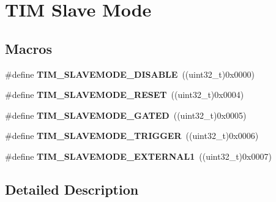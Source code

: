 \hypertarget{group___t_i_m___slave___mode}{}\section{T\+IM Slave Mode}
\label{group___t_i_m___slave___mode}
\subsection*{Macros}
\begin{DoxyCompactItemize}
\item 
\#define {\bfseries T\+I\+M\+\_\+\+S\+L\+A\+V\+E\+M\+O\+D\+E\+\_\+\+D\+I\+S\+A\+B\+LE}~((uint32\+\_\+t)0x0000)\hypertarget{group___t_i_m___slave___mode_ga3b53e1a85d08f125df4371f86bdaf79b}{}\label{group___t_i_m___slave___mode_ga3b53e1a85d08f125df4371f86bdaf79b}

\item 
\#define {\bfseries T\+I\+M\+\_\+\+S\+L\+A\+V\+E\+M\+O\+D\+E\+\_\+\+R\+E\+S\+ET}~((uint32\+\_\+t)0x0004)\hypertarget{group___t_i_m___slave___mode_ga9f28e350c0560dc550f5c0d2f8b39ba7}{}\label{group___t_i_m___slave___mode_ga9f28e350c0560dc550f5c0d2f8b39ba7}

\item 
\#define {\bfseries T\+I\+M\+\_\+\+S\+L\+A\+V\+E\+M\+O\+D\+E\+\_\+\+G\+A\+T\+ED}~((uint32\+\_\+t)0x0005)\hypertarget{group___t_i_m___slave___mode_ga4501317fcd7649e5ff46db6fe69938e0}{}\label{group___t_i_m___slave___mode_ga4501317fcd7649e5ff46db6fe69938e0}

\item 
\#define {\bfseries T\+I\+M\+\_\+\+S\+L\+A\+V\+E\+M\+O\+D\+E\+\_\+\+T\+R\+I\+G\+G\+ER}~((uint32\+\_\+t)0x0006)\hypertarget{group___t_i_m___slave___mode_ga12f8f7b4a16b438f54cf811f0bb0a8a4}{}\label{group___t_i_m___slave___mode_ga12f8f7b4a16b438f54cf811f0bb0a8a4}

\item 
\#define {\bfseries T\+I\+M\+\_\+\+S\+L\+A\+V\+E\+M\+O\+D\+E\+\_\+\+E\+X\+T\+E\+R\+N\+A\+L1}~((uint32\+\_\+t)0x0007)\hypertarget{group___t_i_m___slave___mode_ga90dcf32a66dcb250b18da2ff56471328}{}\label{group___t_i_m___slave___mode_ga90dcf32a66dcb250b18da2ff56471328}

\end{DoxyCompactItemize}


\subsection{Detailed Description}
